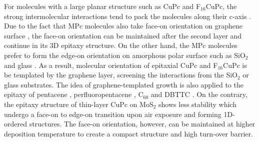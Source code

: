 For molecules with a large planar structure such as CuPc and
F\(_{\text{16}}\)CuPc, the strong intermolecular interactions tend to pack the
molecules along their c-axis
\cite{Ren_2011_DFT_CuPc_epi_gr,Jiang_2014_F16Pc,Yoon_2010_crystal_F16cuPc}. Due
to the fact that MPc molecules also take face-on orientation on
graphene surface
\cite{Xiao_2013_jacs_CuPc_gr,Mativetsky_2014_CuPc_gr,Zhong_2012_gr_F16_pn_junc},
the face-on orientation can be maintained after the second layer and
continue in its 3D epitaxy structure. On the other hand, the MPc
molecules prefer to form the edge-on orientation on amorphous polar
surface such as SiO\(_{\text{2}}\) and glass
\cite{Singha_Roy_2012_CuPc_gr_glass,Xiao_2013_jacs_CuPc_gr,de_Oteyza_2006_F16CuPc_sio2}. As
a result, molecular orientation of epitaxial CuPc and F\(_{\text{16}}\)CuPc is be
templated by the graphene layer, screening the interactions from the
SiO\(_{\text{2}}\) or glass substrates. The idea of graphene-templated growth is
also applied to the epitaxy of pentacene \cite{Lee_2011_pentacene},
perfluoropentacene \cite{Salzmann_2012_fpen_gr}, C\(_{\text{60}}\)
\cite{Kim_2015_c60_gr} and DBTTC \cite{Kim_2016_DBTTC_gr}. On the
contrary, the epitaxy structure of thin-layer CuPc on MoS\(_{\text{2}}\)
\cite{Zhang_2015_CuPc_MoS2} shows less stability which undergo a face-on
to edge-on transition upon air exposure and forming 1D-ordered
structures. The face-on orientation, however, can be maintained at
higher deposition temperature to create a
compact structure and high turn-over barrier.

